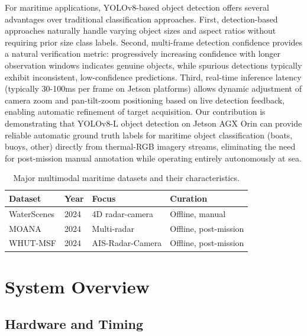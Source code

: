 \documentclass[twocolumn, 10pt]{article}
\begin{document}
For maritime applications, YOLOv8-based object detection offers several advantages over traditional classification approaches. First, detection-based approaches naturally handle varying object sizes and aspect ratios without requiring prior size class labels. Second, multi-frame detection confidence provides a natural verification metric: progressively increasing confidence with longer observation windows indicates genuine objects, while spurious detections typically exhibit inconsistent, low-confidence predictions. Third, real-time inference latency (typically 30-100ms per frame on Jetson platforms) allows dynamic adjustment of camera zoom and pan-tilt-zoom positioning based on live detection feedback, enabling automatic refinement of target acquisition. Our contribution is demonstrating that YOLOv8-L object detection on Jetson AGX Orin can provide reliable automatic ground truth labels for maritime object classification (boats, buoys, other) directly from thermal-RGB imagery streams, eliminating the need for post-mission manual annotation while operating entirely autonomously at sea.

\begin{table}[t]
\caption{Major multimodal maritime datasets and their characteristics.}
\label{tab:maritime_datasets}
\centering
\footnotesize
\begin{tabular}{@{}llll@{}}
\toprule
Dataset & Year & Focus & Curation \\
\midrule
WaterScenes & 2024 & 4D radar-camera & Offline, manual \\
\midrule
MOANA & 2024 & Multi-radar & Offline, post-mission \\
\midrule
WHUT-MSF & 2024 & AIS-Radar-Camera & Offline, post-mission \\
\bottomrule
\end{tabular}
\end{table}

\section{System Overview}

\subsection{Hardware and Timing}
\end{document}

